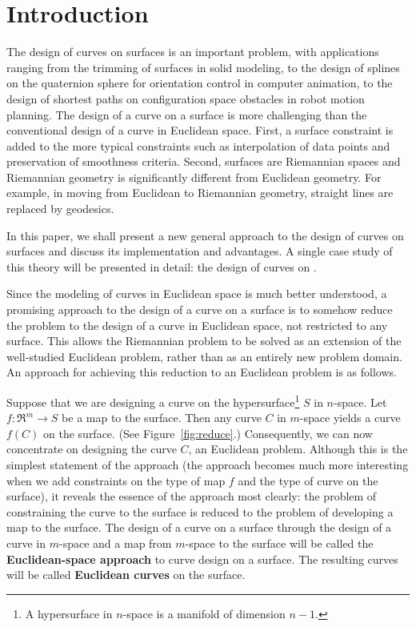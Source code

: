 
\section{Introduction}
\label{sec:intro}

The design of curves on surfaces is an important problem,
with applications ranging from the trimming of surfaces in solid modeling,
to the design of splines on the quaternion sphere for orientation control
in computer animation, to the design of shortest paths on configuration
space obstacles in robot motion planning.
The design of a curve on a surface is more challenging than the 
conventional design of a curve in Euclidean space.
First, a surface constraint is added to the more typical constraints
such as interpolation of data points and preservation of smoothness criteria.
Second, surfaces are Riemannian spaces and 
Riemannian geometry is significantly different from Euclidean geometry.
For example, in moving from Euclidean to Riemannian geometry,
straight lines are replaced by geodesics.

In this paper, we shall present a new general approach to the design of curves
on surfaces and discuss its implementation and advantages.
A single case study of this theory will be presented in detail:
the design of curves on .

Since the modeling of curves in Euclidean space is much better understood, 
a promising approach to the
design of a curve on a surface is to somehow reduce the problem to the 
design of a curve in Euclidean space, not restricted to any surface.
This allows the Riemannian problem to be solved as an extension
of the well-studied Euclidean problem, rather than as an entirely new
problem domain.
An approach for achieving this reduction to an Euclidean problem is as follows.

Suppose that we are designing a curve on the hypersurface\footnote{A
	hypersurface in $n$-space is a manifold of dimension $n-1$.}
$S$ in $n$-space.
Let $f:\Re^m \rightarrow S$ be a map to the surface.
Then any curve $C$ in $m$-space yields a curve $f(C)$ on the surface.
(See Figure~\ref{fig:reduce}.)
Consequently, we can now concentrate on designing the curve $C$, 
an Euclidean problem.
Although this is the simplest statement of the approach (the approach becomes
much more interesting when we add constraints on the type of map $f$ and 
the type of curve on the surface),
it reveals the essence of the approach most clearly:
the problem of constraining the curve to the surface is reduced to the
problem of developing a map to the surface.
The design of a curve on a surface through the design of a curve in $m$-space
and a map from $m$-space to the surface will be called the {\bf Euclidean-space
approach} to curve design on a surface.
The resulting curves will be called {\bf Euclidean curves} on the surface.

